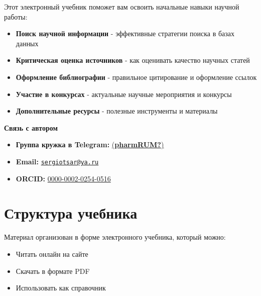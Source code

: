 \documentclass[
  russian,
  letterpaper,
]{book}
\providecommand{\tightlist}{%
  \setlength{\itemsep}{0pt}\setlength{\parskip}{0pt}}
\begin{document}
Этот электронный учебник поможет вам освоить начальные навыки научной
работы:

\begin{itemize}
\tightlist
\item
  \textbf{Поиск научной информации} - эффективные стратегии поиска в
  базах данных
\item
  \textbf{Критическая оценка источников} - как оценивать качество
  научных статей
\item
  \textbf{Оформление библиографии} - правильное цитирование и оформление
  ссылок
\item
  \textbf{Участие в конкурсах} - актуальные научные мероприятия и
  конкурсы
\item
  \textbf{Дополнительные ресурсы} - полезные инструменты и материалы
\end{itemize}

\begin{tcolorbox}[enhanced jigsaw, left=2mm, bottomrule=.15mm, rightrule=.15mm, arc=.35mm, breakable, colframe=quarto-callout-note-color-frame, leftrule=.75mm, opacityback=0, toprule=.15mm, colback=white]

\vspace{-3mm}\textbf{Связь с автором}\vspace{3mm}

\begin{itemize}
\tightlist
\item
  \textbf{Группа кружка в Telegram:}
  \href{https://t.me/pharmRUM}{(\textbf{pharmRUM?})}
\item
  \textbf{Email:}
  \href{mailto:sergiotsar@ya.ru}{\nolinkurl{sergiotsar@ya.ru}}
\item
  \textbf{ORCID:}
  \href{https://orcid.org/0000-0002-0254-0516}{0000-0002-0254-0516}
\end{itemize}

\end{tcolorbox}

\section{Структура
учебника}\label{ux441ux442ux440ux443ux43aux442ux443ux440ux430-ux443ux447ux435ux431ux43dux438ux43aux430}

Материал организован в форме электронного учебника, который можно:

\begin{itemize}
\tightlist
\item
  Читать онлайн на сайте
\item
  Скачать в формате PDF
\item
  Использовать как справочник
\end{itemize}
\end{document}
